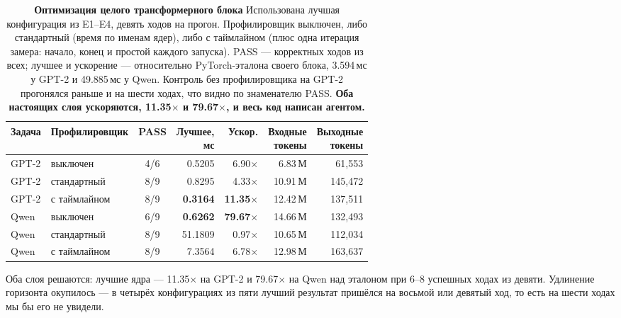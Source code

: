 \documentclass[10pt,a4paper]{article}
\begin{document}
\begin{table}[h]
\centering\footnotesize
\caption{\textbf{Оптимизация целого трансформерного блока} Использована лучшая
конфигурация из E1--E4, девять ходов на прогон. Профилировщик выключен, либо стандартный
(время по именам ядер), либо с таймлайном (плюс одна итерация замера: начало, конец и простой
каждого запуска). PASS --- корректных ходов из всех; лучшее и ускорение --- относительно
PyTorch-эталона своего блока, 3.594\,мс у GPT-2 и 49.885\,мс у Qwen. Контроль без
профилировщика на GPT-2 прогонялся раньше и на шести ходах, что видно по знаменателю PASS.
\textbf{Оба настоящих слоя ускоряются, 11.35$\times$ и 79.67$\times$, и весь код написан
агентом.}}
\label{tab:prof9}
\begin{tabular}{llcrrrr}
\toprule
Задача & Профилировщик & PASS & \thead{Лучшее,\\мс} & Ускор. & \thead{Входные\\токены} & \thead{Выходные\\токены} \\
\midrule
GPT-2 & выключен      & 4/6 & 0.5205 & 6.90$\times$  & 6.83\,М  & 61{,}553  \\
GPT-2 & стандартный   & 8/9 & 0.8295 & 4.33$\times$  & 10.91\,М & 145{,}472 \\
GPT-2 & с таймлайном  & 8/9 & \textbf{0.3164} & \textbf{11.35}$\times$ & 12.42\,М & 137{,}511 \\
\midrule
Qwen  & выключен      & 6/9 & \textbf{0.6262} & \textbf{79.67}$\times$ & 14.66\,М & 132{,}493 \\
Qwen  & стандартный   & 8/9 & 51.1809 & 0.97$\times$  & 10.65\,М & 112{,}034 \\
Qwen  & с таймлайном  & 8/9 & 7.3564 & 6.78$\times$  & 12.98\,М & 163{,}637 \\
\bottomrule
\end{tabular}
\end{table}

Оба слоя решаются: лучшие ядра --- 11.35$\times$ на GPT-2 и 79.67$\times$ на Qwen над
эталоном при 6--8 успешных ходах из девяти. Удлинение горизонта окупилось --- в четырёх конфигурациях
из пяти лучший результат пришёлся на восьмой или девятый ход, то есть на шести ходах мы бы его
не увидели.
\end{document}
